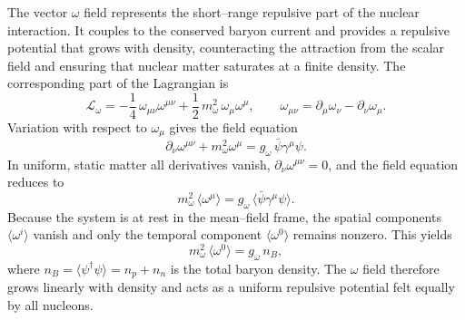 The vector $\omega$ field represents the short–range repulsive part of the
nuclear interaction. It couples to the conserved baryon current and provides a
repulsive potential that grows with density, counteracting the attraction from
the scalar field and ensuring that nuclear matter saturates at a finite
density. The corresponding part of the Lagrangian is
\[
\mathcal{L}_{\omega}
= -\frac{1}{4}\,\omega_{\mu\nu}\omega^{\mu\nu}
  + \frac{1}{2}\,m_{\omega}^{2}\,\omega_{\mu}\omega^{\mu},
\qquad
\omega_{\mu\nu} = \partial_{\mu}\omega_{\nu} - \partial_{\nu}\omega_{\mu}.
\]
Variation with respect to $\omega_{\mu}$ gives the field equation
\begin{equation}
\partial_{\nu}\omega^{\mu\nu} + m_{\omega}^{2}\omega^{\mu}
= g_{\omega}\,\bar{\psi}\gamma^{\mu}\psi.
\end{equation}
In uniform, static matter all derivatives vanish,
$\partial_{\nu}\omega^{\mu\nu} = 0$, and the field equation reduces to
\begin{equation}
m_{\omega}^{2}\,\langle\omega^{\mu}\rangle
= g_{\omega}\,\langle\bar{\psi}\gamma^{\mu}\psi\rangle.
\end{equation}
Because the system is at rest in the mean–field frame, the spatial components
$\langle\omega^{i}\rangle$ vanish and only the temporal component
$\langle\omega^{0}\rangle$ remains nonzero. This yields
\begin{equation}
m_{\omega}^{2}\,\langle\omega^{0}\rangle = g_{\omega}\,n_{B},
\label{eq:omega_field_eq}
\end{equation}
where $n_{B} = \langle\psi^{\dagger}\psi\rangle = n_{p} + n_{n}$ is the total
baryon density. The $\omega$ field therefore grows linearly with density and
acts as a uniform repulsive potential felt equally by all nucleons.

